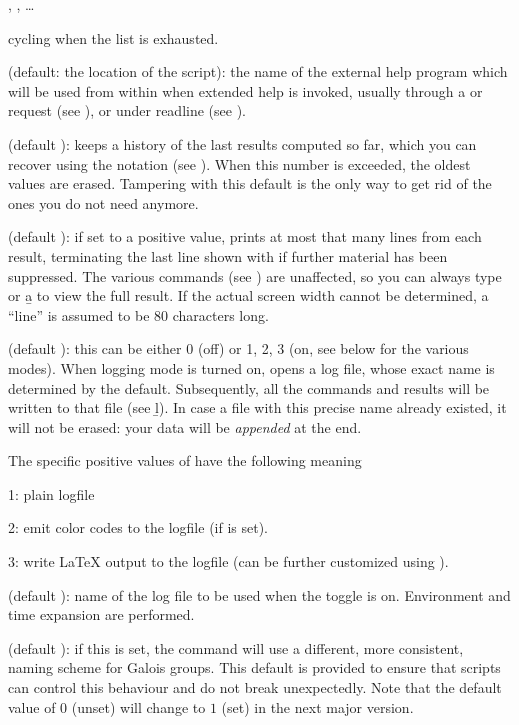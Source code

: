   , ,
  \dots

cycling when the  list is exhausted.

 (default: the location of the  script): the
name of the external help program which will be used from within  when
extended help is invoked, usually through a  or  request
(see ), or  under readline (see
).

 (default ):  keeps a history of the last
 results computed so far, which you can recover using the
\kbd{\%} notation (see ). When this number is exceeded,
the oldest values are erased. Tampering with this default is the only way to
get rid of the ones you do not need anymore.

 (default ): if set to a positive value,  prints at
most that many lines from each result, terminating the last line shown with
\kbd{[+++]} if further material has been suppressed. The various 
commands (see ) are unaffected, so you can always type
 or \b{a} to view the full result. If the actual
screen width cannot be determined, a ``line'' is assumed to be 80 characters
long.

 (default ): this can be either 0 (off) or 1, 2, 3
(on, see below for the various modes). When logging mode is turned on,
opens a log file, whose exact name is determined by the 
default. Subsequently, all the commands and results will be written to that
file (see \b{l}). In case a file with this precise name already existed, it
will not be erased: your data will be \emph{appended} at the end.

The specific positive values of  have the following meaning

1: plain logfile

2: emit color codes to the logfile (if  is set).

3: write LaTeX output to the logfile (can be further customized using
).

 (default ): name of the log file to be
used when the  toggle is on. Environment and time expansion are
performed.

 (default ): if
this is set, the  command will use a different, more
consistent, naming scheme for Galois groups. This default is provided to
ensure that scripts can control this behaviour and do not break unexpectedly.
Note that the default value of $0$ (unset) will change to $1$ (set) in the
next major version.

